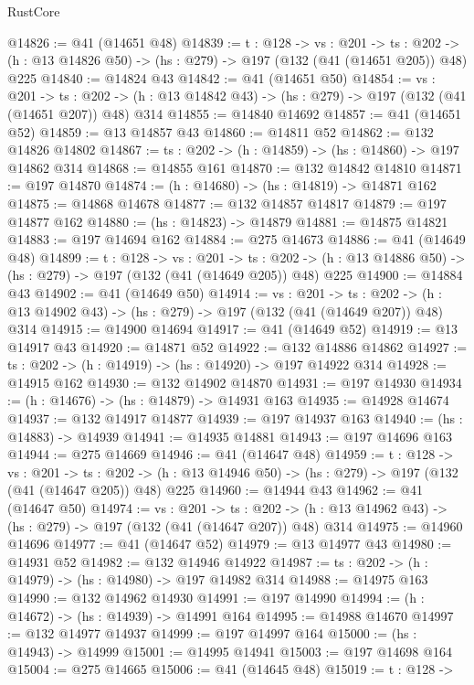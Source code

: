 \begin{lexlean}{RustCore}
\begin{coremodule}
@14826 := @41 (@14651 @48)
@14839 := {t : @128} ->
  {vs : @201} ->
  {ts : @202} -> (h : @13 @14826 @50) -> (hs : @279) -> @197 (@132 (@41 (@14651 @205)) @48) @225
@14840 := @14824 @43
@14842 := @41 (@14651 @50)
@14854 := {vs : @201} ->
  {ts : @202} -> (h : @13 @14842 @43) -> (hs : @279) -> @197 (@132 (@41 (@14651 @207)) @48) @314
@14855 := @14840 @14692
@14857 := @41 (@14651 @52)
@14859 := @13 @14857 @43
@14860 := @14811 @52
@14862 := @132 @14826 @14802
@14867 := {ts : @202} -> (h : @14859) -> (hs : @14860) -> @197 @14862 @314
@14868 := @14855 @161
@14870 := @132 @14842 @14810
@14871 := @197 @14870
@14874 := (h : @14680) -> (hs : @14819) -> @14871 @162
@14875 := @14868 @14678
@14877 := @132 @14857 @14817
@14879 := @197 @14877 @162
@14880 := (hs : @14823) -> @14879
@14881 := @14875 @14821
@14883 := @197 @14694 @162
@14884 := @275 @14673
@14886 := @41 (@14649 @48)
@14899 := {t : @128} ->
  {vs : @201} ->
  {ts : @202} -> (h : @13 @14886 @50) -> (hs : @279) -> @197 (@132 (@41 (@14649 @205)) @48) @225
@14900 := @14884 @43
@14902 := @41 (@14649 @50)
@14914 := {vs : @201} ->
  {ts : @202} -> (h : @13 @14902 @43) -> (hs : @279) -> @197 (@132 (@41 (@14649 @207)) @48) @314
@14915 := @14900 @14694
@14917 := @41 (@14649 @52)
@14919 := @13 @14917 @43
@14920 := @14871 @52
@14922 := @132 @14886 @14862
@14927 := {ts : @202} -> (h : @14919) -> (hs : @14920) -> @197 @14922 @314
@14928 := @14915 @162
@14930 := @132 @14902 @14870
@14931 := @197 @14930
@14934 := (h : @14676) -> (hs : @14879) -> @14931 @163
@14935 := @14928 @14674
@14937 := @132 @14917 @14877
@14939 := @197 @14937 @163
@14940 := (hs : @14883) -> @14939
@14941 := @14935 @14881
@14943 := @197 @14696 @163
@14944 := @275 @14669
@14946 := @41 (@14647 @48)
@14959 := {t : @128} ->
  {vs : @201} ->
  {ts : @202} -> (h : @13 @14946 @50) -> (hs : @279) -> @197 (@132 (@41 (@14647 @205)) @48) @225
@14960 := @14944 @43
@14962 := @41 (@14647 @50)
@14974 := {vs : @201} ->
  {ts : @202} -> (h : @13 @14962 @43) -> (hs : @279) -> @197 (@132 (@41 (@14647 @207)) @48) @314
@14975 := @14960 @14696
@14977 := @41 (@14647 @52)
@14979 := @13 @14977 @43
@14980 := @14931 @52
@14982 := @132 @14946 @14922
@14987 := {ts : @202} -> (h : @14979) -> (hs : @14980) -> @197 @14982 @314
@14988 := @14975 @163
@14990 := @132 @14962 @14930
@14991 := @197 @14990
@14994 := (h : @14672) -> (hs : @14939) -> @14991 @164
@14995 := @14988 @14670
@14997 := @132 @14977 @14937
@14999 := @197 @14997 @164
@15000 := (hs : @14943) -> @14999
@15001 := @14995 @14941
@15003 := @197 @14698 @164
@15004 := @275 @14665
@15006 := @41 (@14645 @48)
@15019 := {t : @128} ->

\end{coremodule}
\end{lexlean}
